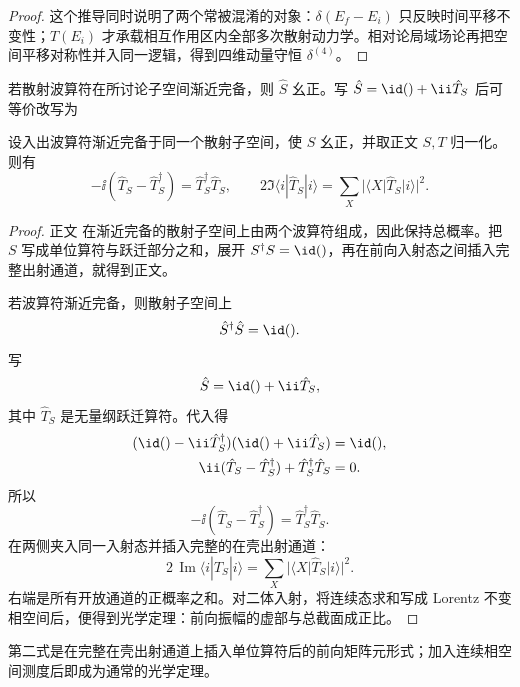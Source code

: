 \begin{proof}
这个推导同时说明了两个常被混淆的对象：\(\delta(E_f-E_i)\) 只反映时间平移不变性；\(T(E_i)\) 才承载相互作用区内全部多次散射动力学。相对论局域场论再把空间平移对称性并入同一逻辑，得到四维动量守恒 \(\delta^{(4)}\)。
\end{proof}
若散射波算符在所讨论子空间渐近完备，则 $\hat S$ 幺正。写 $\hat S=\id()+\ii\hat T_S$ 后可等价改写为


\begin{proposition}[散射矩阵的光学恒等式]
设入出波算符渐近完备于同一个散射子空间，使 $S$ 幺正，并取正文 $S,T$ 归一化。则有
\begin{equation}
 {
 -\ii(\hat T_S-\hat T_S^\dagger)
 =\hat T_S^\dagger\hat T_S,
 \qquad
 2\Im\langle i|\hat T_S|i\rangle
 =\sum_X|\langle X|\hat T_S|i\rangle|^2.}
\label{eq:optical-unitarity-r68}
\end{equation}
\end{proposition}
\begin{proof}
正文 在渐近完备的散射子空间上由两个波算符组成，因此保持总概率。把 $S$ 写成单位算符与跃迁部分之和，展开 $S^\dagger S=\id()$，再在前向入射态之间插入完整出射通道，就得到正文。



若波算符渐近完备，则散射子空间上
\begin{equation*}
 \hat S^\dagger\hat S=\id().
\end{equation*}
写
\begin{equation*}
 \hat S=\id()+\ii\hat T_S,
\end{equation*}
其中 $\hat T_S$ 是无量纲跃迁算符。代入得
\begin{align*}
 (\id()-\ii\hat T_S^\dagger)
 (\id()+\ii\hat T_S)
 &=\id(),\\
 \ii(\hat T_S-\hat T_S^\dagger)
 +\hat T_S^\dagger\hat T_S
 &=0.
\end{align*}
所以
\begin{equation*}
 {
 -\ii(
 \hat T_S-\hat T_S^\dagger)
 =
 \hat T_S^\dagger\hat T_S.}
 \end{equation*}
在两侧夹入同一入射态并插入完整的在壳出射通道：
\begin{equation*}
 2\,\operatorname{Im}
 \langle i|\hat T_S|i\rangle
 =
 \sum_X
 |\langle X|\hat T_S|i\rangle|^2.
 \end{equation*}
右端是所有开放通道的正概率之和。对二体入射，将连续态求和写成 Lorentz 不变相空间后，便得到光学定理：前向振幅的虚部与总截面成正比。
\end{proof}

第二式是在完整在壳出射通道上插入单位算符后的前向矩阵元形式；加入连续相空间测度后即成为通常的光学定理。

